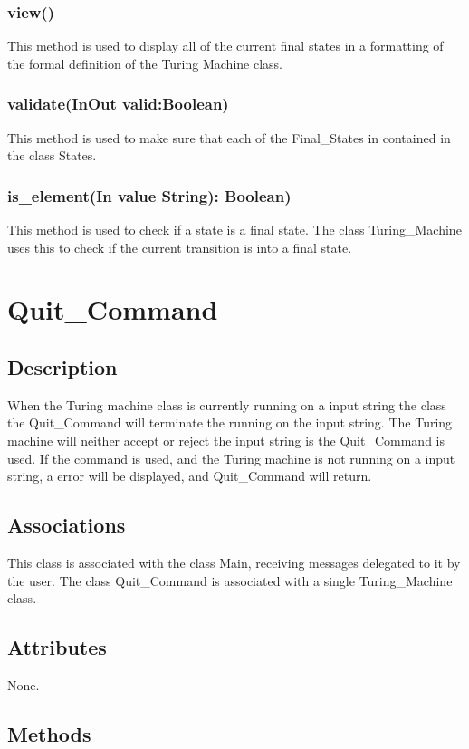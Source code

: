 \documentclass{report}
\begin{document}
    \subsubsection{view()}
    This method is used to display all of the current final states in a formatting of the formal definition of the Turing Machine class.
    \subsubsection{validate(InOut valid:Boolean)}
    This method is used to make sure that each of the Final\_States in contained in the class States.
    \subsubsection{is\_element(In value String): Boolean)}
    This method is used to check if a state is a final state. The class Turing\_Machine uses this to check if the current transition is into a final state.
    
    
\section{Quit\_Command}
	\subsection{Description}
    When the Turing machine class is currently running on a input string the class the Quit\_Command will terminate the running on the input string. The Turing machine will neither accept or reject the input string is the Quit\_Command is used. If the command is used, and the Turing machine is not running on a input string, a error will be displayed, and Quit\_Command will return. 
    \subsection{Associations} 
    This class is associated with the class Main, receiving messages delegated to it by the user.
    The class Quit\_Command is associated with a single Turing\_Machine class.
    
    \subsection{Attributes} 
    None.
    
    \subsection{Methods} 
\end{document}
